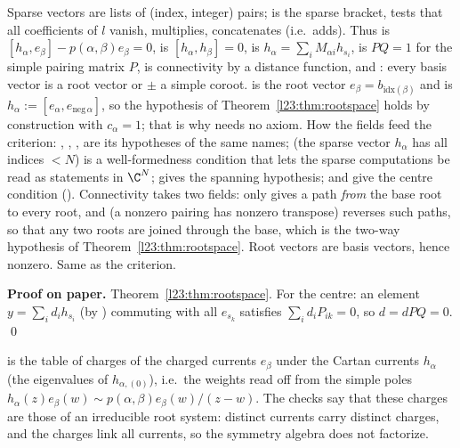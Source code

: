\begin{dictionary}
Sparse vectors are lists of (index, integer) pairs;  is the sparse bracket,  tests that all coefficients of $l$
vanish,  multiplies, \lean{++} concatenates (i.e.\ adds). Thus  is $[h_\alpha,e_\beta]-p(\alpha,\beta)e_\beta=0$,
 is $[h_\alpha,h_\beta]=0$,  is $h_\alpha=\sum_iM_{\alpha i}h_{s_i}$,  is $PQ=1$ for the simple pairing matrix $P$,
 is connectivity by a distance function, and : every basis vector is a root vector or $\pm$ a simple coroot.
 is the root vector $e_\beta=b_{\mathrm{idx}(\beta)}$ and  is $h_\alpha:=[e_\alpha,e_{\mathrm{neg}\,\alpha}]$, so the
hypothesis  of Theorem~\ref{l23:thm:rootspace} holds by construction with $c_\alpha=1$; that is why  needs no axiom.
How the fields feed the criterion: , , ,  are its hypotheses of the same names;
 (the sparse vector $h_\alpha$ has all indices $<N$) is a well-formedness condition that lets the sparse computations be
read as statements in $\C^N$;  gives the spanning hypothesis;  and  give the centre condition
(). Connectivity takes two fields:  only gives a path \emph{from} the base root
 to every root, and  (a nonzero pairing has nonzero transpose) reverses such paths, so that any two roots are joined
through the base, which is the two-way  hypothesis  of Theorem~\ref{l23:thm:rootspace}. Root vectors
are basis vectors, hence nonzero. Same as the criterion.
\end{dictionary}

\textbf{Proof on paper.} Theorem~\ref{l23:thm:rootspace}. For the centre: an element $y=\sum_id_ih_{s_i}$ (by ) commuting with all
$e_{s_k}$ satisfies $\sum_id_iP_{ik}=0$, so $d=dPQ=0$. \qed

\begin{physics}
 is the table of charges of the charged currents $e_\beta$ under the Cartan currents $h_\alpha$ (the eigenvalues of
$h_{\alpha,(0)}$), i.e.\ the weights read off from the simple poles $h_\alpha(z)e_\beta(w)\sim p(\alpha,\beta)e_\beta(w)/(z-w)$. The checks say
that these charges are those of an irreducible root system: distinct currents carry distinct charges, and the charges link all
currents, so the symmetry algebra does not factorize.
\end{physics}

